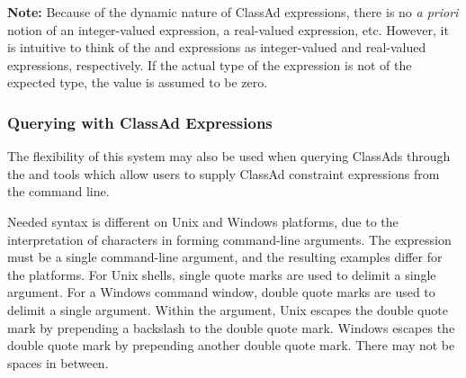 \textbf{Note:}  Because of the dynamic nature of ClassAd expressions, there
is no \emph{a priori} notion of an integer-valued expression, a real-valued
expression, etc.  However, it is intuitive to think of the 
and  expressions as integer-valued and real-valued expressions,
respectively.  If the actual type of the expression is not of the expected 
type, the value is assumed to be zero.

\subsubsection{\label{classad-query-examples}Querying with ClassAd Expressions}
The flexibility of this system may also be used when querying ClassAds
through the  and  tools which allow users to
supply ClassAd constraint expressions from the command line.

Needed syntax is different on Unix and Windows platforms, 
due to the interpretation of characters in forming command-line arguments.
The expression must be a single command-line argument,
and the resulting examples differ for the platforms.
For Unix shells,
single quote marks are used to delimit a single argument.
For a Windows command window,
double quote marks are used to delimit a single argument.
Within the argument,
Unix escapes the double quote mark by prepending a backslash to the double
quote mark.
Windows escapes the double quote mark by prepending another double
quote mark. There may not be spaces in between.

